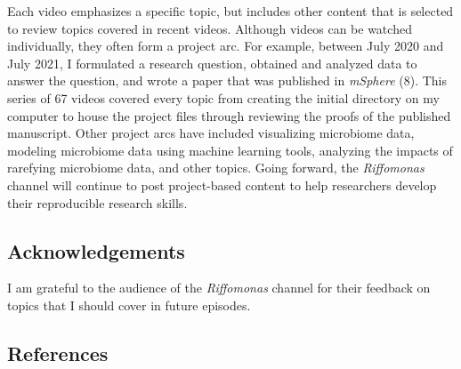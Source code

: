 \documentclass[
]{article}
\begin{document}
Each video emphasizes a specific topic, but includes other content that
is selected to review topics covered in recent videos. Although videos
can be watched individually, they often form a project arc. For example,
between July 2020 and July 2021, I formulated a research question,
obtained and analyzed data to answer the question, and wrote a paper
that was published in \emph{mSphere} (8). This series of 67 videos
covered every topic from creating the initial directory on my computer
to house the project files through reviewing the proofs of the published
manuscript. Other project arcs have included visualizing microbiome
data, modeling microbiome data using machine learning tools, analyzing
the impacts of rarefying microbiome data, and other topics. Going
forward, the \emph{Riffomonas} channel will continue to post
project-based content to help researchers develop their reproducible
research skills.

\hypertarget{acknowledgements}{%
\subsection{Acknowledgements}\label{acknowledgements}}

I am grateful to the audience of the \emph{Riffomonas} channel for their
feedback on topics that I should cover in future episodes.

\newpage

\hypertarget{references}{%
\subsection{References}\label{references}}
\end{document}
